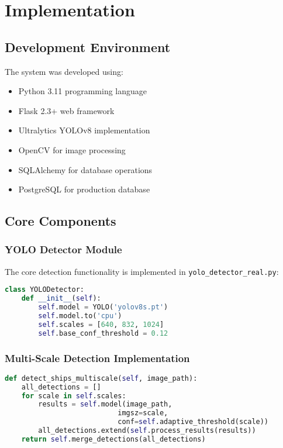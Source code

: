 \documentclass[12pt,a4paper]{report}
\begin{document}
\chapter{Implementation}

\section{Development Environment}
The system was developed using:
\begin{itemize}
    \item Python 3.11 programming language
    \item Flask 2.3+ web framework
    \item Ultralytics YOLOv8 implementation
    \item OpenCV for image processing
    \item SQLAlchemy for database operations
    \item PostgreSQL for production database
\end{itemize}

\section{Core Components}

\subsection{YOLO Detector Module}
The core detection functionality is implemented in \texttt{yolo\_detector\_real.py}:

\begin{lstlisting}[language=Python, caption=YOLO Detector Initialization]
class YOLODetector:
    def __init__(self):
        self.model = YOLO('yolov8s.pt')
        self.model.to('cpu')
        self.scales = [640, 832, 1024]
        self.base_conf_threshold = 0.12
\end{lstlisting}

\subsection{Multi-Scale Detection Implementation}
\begin{lstlisting}[language=Python, caption=Multi-Scale Detection]
def detect_ships_multiscale(self, image_path):
    all_detections = []
    for scale in self.scales:
        results = self.model(image_path, 
                           imgsz=scale, 
                           conf=self.adaptive_threshold(scale))
        all_detections.extend(self.process_results(results))
    return self.merge_detections(all_detections)
\end{lstlisting}
\end{document}
